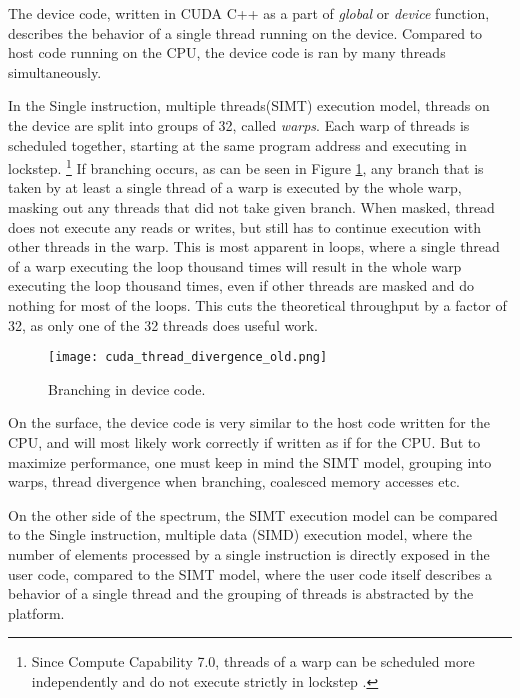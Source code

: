 The device code, written in CUDA C++ as a part of \textit{global} or \textit{device} function, describes the behavior of a single thread running on the device. Compared to host code running on the CPU, the device code is ran by many threads simultaneously.



In the Single instruction, multiple threads(SIMT) execution model, threads on the device are split into groups of 32, called \textit{warps}. Each warp of threads is scheduled together, starting at the same program address and executing in lockstep. \footnote{Since Compute Capability 7.0, threads of a warp can be scheduled more independently and do not execute strictly in lockstep \citep{paper:volta}.}
If branching occurs, as can be seen in Figure \ref{fig:thread_divergence_old}, any branch that is taken by at least a single thread of a warp is executed by the whole warp, masking out any threads that did not take given branch. When masked, thread does not execute any reads or writes, but still has to continue execution with other threads in the warp. This is most apparent in loops, where a single thread of a warp executing the loop thousand times will result in the whole warp executing the loop thousand times, even if other threads are masked and do nothing for most of the loops. This cuts the theoretical throughput by a factor of 32, as only one of the 32 threads does useful work.

\begin{figure}[h]
	\centering
	\texttt{[image: cuda\_thread\_divergence\_old.png]}
	\caption{Branching in device code.}
	\label{fig:thread_divergence_old}
\end{figure}


On the surface, the device code is very similar to the host code written for the CPU, and will most likely work correctly if written as if for the CPU. But to maximize performance, one must keep in mind the SIMT model, grouping into warps, thread divergence when branching, coalesced memory accesses etc.

On the other side of the spectrum, the SIMT execution model can be compared to the Single instruction, multiple data (SIMD) execution model, where the number of elements processed by a single instruction is directly exposed in the user code, compared to the SIMT model, where the user code itself describes a behavior of a single thread and the grouping of threads is abstracted by the platform. 

